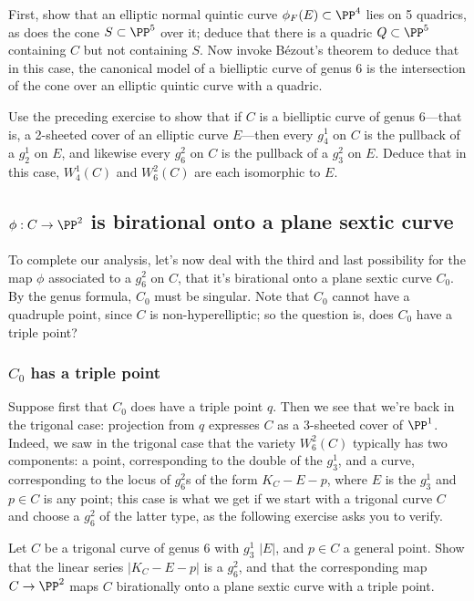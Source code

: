 \begin{exercise}
First, show that an elliptic normal quintic curve $\phi_F(E) \subset \PP^4$ lies on 5 quadrics, as does the cone $S \subset \PP^5$ over it; deduce that there is a quadric $Q \subset \PP^5$ containing $C$ but not containing $S$. Now invoke B\'ezout's theorem to deduce that in this case, the canonical model of a bielliptic curve of genus 6 is the intersection of the cone over an elliptic quintic curve with a quadric.
\end{exercise}


\begin{exercise}
Use the preceding exercise to show that if $C$ is a bielliptic curve of genus 6---that is, a 2-sheeted cover of an elliptic curve $E$---then every $g^1_4$ on $C$ is the pullback of a $g^1_2$ on $E$, and likewise  every $g^2_6$ on $C$ is the pullback of a $g^2_3$ on $E$. Deduce that in this case, $W^1_4(C)$ and $W^2_6(C)$ are each isomorphic to $E$.
\end{exercise}

\subsection{$\phi : C \to \PP^2$ is birational onto a plane sextic curve}

To complete our analysis, let's now deal with the third and last possibility for the map $\phi$ associated to a $g^2_6$ on $C$, that it's birational onto a plane sextic curve $C_0$. By the genus formula, $C_0$ must be singular. Note that $C_0$ cannot have a quadruple point, since $C$ is non-hyperelliptic; so the question is, does $C_0$ have a triple point?

\subsubsection{$C_0$ has a triple point} Suppose first that $C_0$ does have a triple point $q$. Then we see that we're back in the trigonal case: projection from $q$ expresses $C$ as a 3-sheeted cover of $\PP^1$. Indeed, we saw in the trigonal case that the variety $W^2_6(C)$ typically has two components: a point, corresponding to the double of the $g^1_3$, and a curve, corresponding to the locus of $g^2_6$s of the form $K_C - E - p$, where $E$ is the $g^1_3$ and $p \in C$ is any point; this case is what we get if we start with a trigonal curve $C$ and choose a $g^2_6$ of the latter type, as the following exercise asks you to verify.


\begin{exercise}
Let $C$ be a trigonal curve of genus 6 with $g^1_3$ $|E|$, and $p \in C$ a general point. Show that the linear series $|K_C - E-p|$ is a $g^2_6$, and that the corresponding map $C \to \PP^2$ maps $C$ birationally onto a plane sextic curve with a triple point.
\end{exercise}

